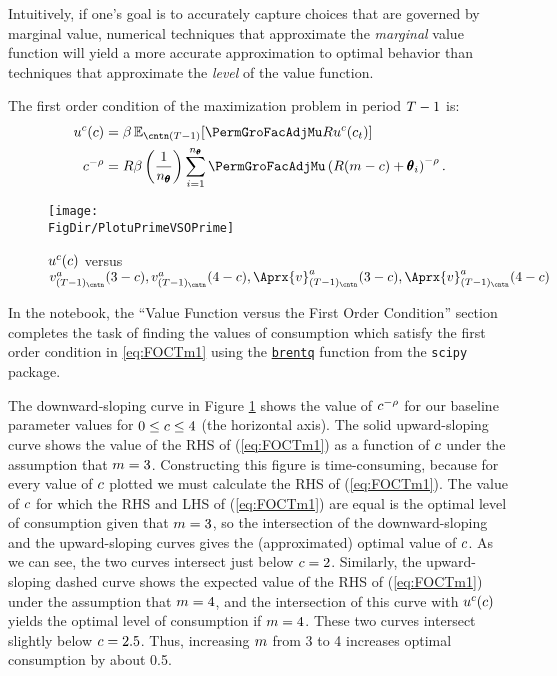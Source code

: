 Intuitively, if one's goal is to accurately capture choices
that are governed by marginal value,
numerical techniques that approximate the \textit{marginal} value
function will yield a more accurate approximation to
optimal behavior than techniques that approximate the \textit{level}
of the value function.

The first order condition of the maximization problem in period $T-1$ is:
  \begin{equation}\begin{gathered}\begin{aligned}
        \uFunc^{{c}}(\cNrm)       & = \DiscFac \Ex_{\cntn(T-1)} [\PermGroFacAdjMu\Rfree \uFunc^{{c}}({c}_{\prdT})]  %
        \\      \cNrm^{-\CRRA}   & = \Rfree \DiscFac \left(\frac{1}{n_{\TranShkEmp}}\right) \sum_{i=1}^{n_{\TranShkEmp}} \PermGroFacAdjMu\left(\Rfree (\mNrm-\cNrm) + \TranShkEmp_{i}\right)^{-\CRRA} \label{eq:FOCTm1}.
      \end{aligned}\end{gathered}\end{equation}
\hypertarget{PlotuPrimeVSOPrime}{}
\begin{figure}
  \centerline{\texttt{[image: \\FigDir/PlotuPrimeVSOPrime]}}
  \caption{$u^{{c}}(c)$ versus $\vFunc_{({\trmT-1})_\cntn}^{{a}}(3-c), \vFunc_{({\trmT-1})_\cntn}^{{a}}(4-c), \Aprx{\vFunc}_{({\trmT-1})_\cntn}^{{a}}(3-c), \Aprx{\vFunc}_{({\trmT-1})_\cntn}^{{a}}(4-c)$}
  \label{fig:PlotuPrimeVSOPrime}
\end{figure}

In the notebook, the ``Value Function versus the First Order Condition'' section completes the task of finding the values of consumption which satisfy the first order condition in \eqref{eq:FOCTm1} using the \href{https://docs.scipy.org/doc/scipy/reference/generated/scipy.optimize.brentq.html}{\texttt{brentq}} function from the \texttt{scipy} package.%


The downward-sloping curve in Figure \ref{fig:PlotuPrimeVSOPrime}
shows the value of $c^{-\rho}$ for our baseline parameter values
for $0 \leq c \leq 4$ (the horizontal axis).  The solid
upward-sloping curve shows the value of the RHS of (\ref{eq:FOCTm1})
as a function of $c$ under the assumption that $m=3$.
Constructing this figure is time-consuming, because for every
value of $c$ plotted we must calculate the RHS of
(\ref{eq:FOCTm1}).  The value of $c$ for which the RHS and LHS
of (\ref{eq:FOCTm1}) are equal is the optimal level of consumption
given that $m=3$, so the intersection of the downward-sloping
and the upward-sloping curves gives the (approximated) optimal value of $c$.
As we can see, the two curves intersect just below $c=2$.
Similarly, the upward-sloping dashed curve shows the expected value
of the RHS of (\ref{eq:FOCTm1}) under the assumption that $m=4$,
and the intersection of this curve with $u^{{c}}(c)$ yields the
optimal level of consumption if $m=4$.  These two curves
intersect slightly below $c=2.5$.  Thus, increasing $m$
from 3 to 4 increases optimal consumption by about 0.5.

